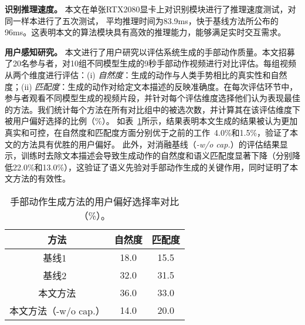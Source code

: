 

\textbf{识别推理速度。}
本文在单张RTX2080显卡上对识别模块进行了推理速度测试，对同一样本进行了五次测试，
平均推理时间为83.9ms，快于基线方法\cite{范桂双2020基于S3D}所公布的96ms。这表明本文的算法模块具有高效的推理能力，能够满足实时交互需求。



\textbf{用户感知研究。}
本文进行了用户研究以评估系统生成的手部动作质量。本文招募了20名参与者，对10组不同模型生成的9秒手部动作视频进行对比评估。每组视频从两个维度进行评估：(i) \textit{自然度}：生成的动作与人类手势相比的真实性和自然度；(ii) \textit{匹配度}：生成的动作对给定文本描述的反映准确度。在每次评估环节中，参与者观看不同模型生成的视频片段，并针对每个评估维度选择他们认为表现最佳的方法。我们统计每个方法在所有对比组中的被选次数，并计算其在该评估维度下被用户偏好选择的比例（\%）。
如表~\ref{tab:perceptual_study}所示，结果表明本文生成的结果被认为更加真实和可控，在自然度和匹配度方面分别优于之前的工作~\cite{chen2024syntalker}4.0\%和1.5\%，验证了本文的方法具有优胜的用户偏好。
此外，对消融基线（\textit{-w/o cap.}）的评估结果显示，训练时去除文本描述会导致生成动作的自然度和语义匹配度显著下降（分别降低22.0\%和13.0\%），这验证了语义先验对手部动作生成的关键作用，同时证明了本文方法的有效性。

\begin{table}[t]
  \centering
  \caption{手部动作生成方法的用户偏好选择率对比（\%）。}
  \small
  \label{tab:perceptual_study}
  \begin{tabular}{c cc}
  \toprule
  方法 & 自然度 & 匹配度 \\
  \midrule
  基线1~\cite{yang2024freetalker} & 18.0  & 15.5 \\
  基线2~\cite{chen2024syntalker} & 32.0  & 31.5 \\
  本文方法 & 36.0  & 33.0 \\
  本文方法（-w/o cap.） & 14.0  & 20.0 \\
  \bottomrule
  \end{tabular}
\end{table}

